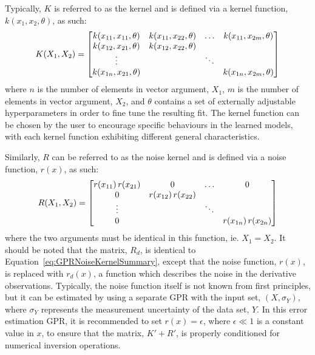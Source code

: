 \documentclass{article}
\begin{document}
Typically, $K$ is referred to as the kernel and is defined via a kernel function, $k\!\left(x_1,x_2,\theta\right)$, as such:
\begin{equation}
\label{eq:GPRKernelSummary}
	K\!\left(X_1,X_2\right) =
	\begin{bmatrix}
	k\!\left(x_{11},x_{11},\theta\right) & k\!\left(x_{11},x_{22},\theta\right) & \hdotsfor{1} & k\!\left(x_{11},x_{2m},\theta\right) \\
	k\!\left(x_{12},x_{21},\theta\right) & k\!\left(x_{12},x_{22},\theta\right) & & \\
	\vdots & & \ddots & \\
	k\!\left(x_{1n},x_{21},\theta\right) & & & k\!\left(x_{1n},x_{2m},\theta\right)
	\end{bmatrix}
\end{equation}
where $n$ is the number of elements in vector argument, $X_1$, $m$ is the number of elements in vector argument, $X_2$, and $\theta$ contains a set of externally adjustable hyperparameters in order to fine tune the resulting fit. The kernel function can be chosen by the user to encourage specific behaviours in the learned models, with each kernel function exhibiting different general characteristics.

Similarly, $R$ can be referred to as the noise kernel and is defined via a noise function, $r\!\left(x\right)$, as such:
\begin{equation}
\label{eq:GPRNoiseKernelSummary}
	R\!\left(X_1,X_2\right) =
	\begin{bmatrix}
	r\!\left(x_{11}\right) r\!\left(x_{21}\right) & 0 & \hdotsfor{1} & 0 \\
	0 & r\!\left(x_{12}\right) r\!\left(x_{22}\right) & & \\
	\vdots & & \ddots & \\
	0 & & & r\!\left(x_{1n}\right) r\!\left(x_{2n}\right)
	\end{bmatrix}
\end{equation}
where the two arguments must be identical in this function, ie. $X_1 = X_2$. It should be noted that the matrix, $R_d$, is identical to Equation~\eqref{eq:GPRNoiseKernelSummary}, except that the noise function, $r\!\left(x\right)$, is replaced with $r_d\!\left(x\right)$, a function which describes the noise in the derivative observations. Typically, the noise function itself is not known from first principles, but it can be estimated by using a separate GPR with the input set, $\left(X,\sigma_Y\right)$, where $\sigma_Y$ represents the measurement uncertainty of the data set, $Y$. In this error estimation GPR, it is recommended to set $r\!\left(x\right) = \epsilon$, where $\epsilon \ll 1$ is a constant value in $x$, to ensure that the matrix, $K' + R'$, is properly conditioned for numerical inversion operations.
\end{document}
